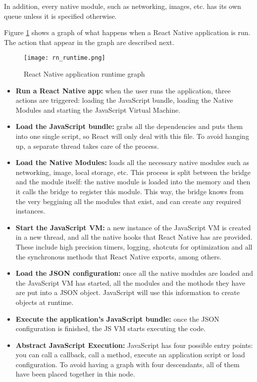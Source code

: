 In addition, every native module, such as networking, images, etc. has its own queue unless it is specified otherwise.

Figure \ref{fig:rnruntime} shows a graph of what happens when a React Native application is run. The action that appear in the graph are described next.

\begin{figure}[H]
	\centering
	\texttt{[image: rn\_runtime.png]}
	\caption{React Native application runtime graph\label{fig:rnruntime}}
\end{figure}

\begin{itemize}
 \item \textbf{Run a React Native app:} when the user runs the application, three actions are triggered: loading the JavaScript bundle, loading the Native Modules and starting the JavaScript Virtual Machine.
 \item \textbf{Load the JavaScript bundle:} grabs all the dependencies and puts them into one single script, so React will only deal with this file. To avoid hanging up, a separate thread takes care of the process.
 \item \textbf{Load the Native Modules:} loads all the necessary native modules such as networking, image, local storage, etc. This process is split between the bridge and the module itself: the native module is loaded into the memory and then it calls the bridge to register this module. This way, the bridge knows from the very beggining all the modules that exist, and can create any required instances.
 \item \textbf{Start the JavaScript VM:} a new instance of the JavaScript VM is created in a new thread, and all the native hooks that React Native has are provided. These include high precision timers, logging, shotcuts for optimization and all the synchronous methods that React Native exports, among others.
 \item \textbf{Load the JSON configuration:} once all the native modules are loaded and the JavaScript VM has started, all the modules and the mothods they have are put into a JSON object. JavaScript will use this information to create objects at runtime.
 \item \textbf{Execute the application's JavaScript bundle:} once the JSON configuration is finished, the JS VM starts executing the code.
 \item \textbf{Abstract JavaScript Execution:} JavaScript has four possible entry points: you can call a callback, call a method, execute an application script or load configuration. To avoid having a graph with four descendants, all of them have been placed together in this node.

\end{itemize}
